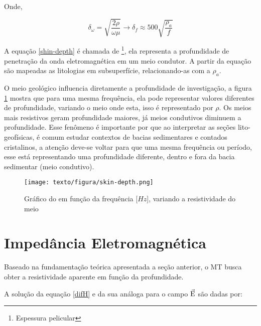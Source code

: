         \noindent Onde,
        
        \begin{equation}
            \label{shin-depth}
            \delta_\omega = \sqrt{\dfrac{2 \rho}{\omega \mu}} \longrightarrow \delta_f \approx 500  \sqrt{\frac{\rho_a}{f}}
        \end{equation}
        
        A equação \ref{shin-depth} é chamada de \footnote{Espessura pelicular}, ela representa a profundidade de penetração da onda eletromagnética em um meio condutor.
        A partir da equação são mapeadas as litologias em subsuperfície, relacionando-as com a $\rho_a$.        

        O meio geológico influencia diretamente a profundidade de investigação, a figura \ref{fig-skin-depth} mostra que para uma mesma frequência, ela pode representar valores diferentes de profundidade, variando o meio onde esta, isso é representado por $\rho$. Os meios mais resistivos geram profundidade maiores, já meios condutivos diminuem a profundidade. Esse fenômeno é importante por que ao interpretar as seções lito-geofísicas, é comum estudar contextos de bacias sedimentares e contados cristalinos, a atenção deve-se voltar para que uma mesma frequência ou período, esse está representando uma profundidade diferente, dentro e fora da bacia sedimentar (meio condutivo). 
        
        \begin{figure}[H]
            \caption[Gráfico do ]{Gráfico do  em função da frequência [$Hz$], variando a resistividade do meio}
            \begin{center}
                \texttt{[image: texto/figura/skin-depth.png]}
            \end{center}
            \label{fig-skin-depth}
        \end{figure}
        
    \section{Impedância Eletromagnética}
        
        Baseado na fundamentação teórica apresentada a seção anterior, o MT busca obter a resistividade aparente em função da profundidade. 
        
        A solução da equação \ref{difH} e da sua análoga para o campo $\vec{\textrm{E}}$ são dadas por:
        
